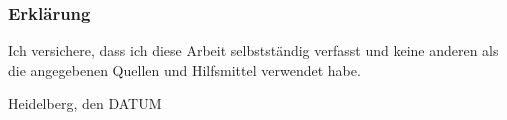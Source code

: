   
\subsubsection*{Erklärung}\label{sub:Erklärung}

Ich versichere, dass ich diese Arbeit selbstständig verfasst und keine 
anderen als die angegebenen Quellen und Hilfsmittel verwendet habe.

\vspace{2\baselineskip}

Heidelberg, den DATUM \hspace{5em} \hrulefill{}


